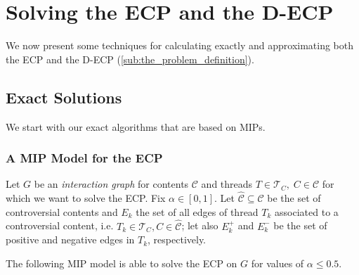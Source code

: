\chapter{Solving the \acrshort{ECP} and the \acrshort{D-ECP}}
\label{ch:solving}

We now present some techniques for calculating exactly and approximating both
the \acrshort{ECP} and the \acrshort{D-ECP} (\autoref{sub:the_problem_definition}).

\section{Exact Solutions}%
\label{sec:exact-solutions}

We start with our exact algorithms that are based on MIPs.

\subsection{A MIP Model for the \acrshort{ECP}}%
\label{sub:a_mip_model_for_the_ecp}

Let $G$ be an \emph{interaction graph} for contents $\mathcal{C} $ and
threads $T \in \mathcal{T}_{C}, \; C \in \mathcal{C} $ for which we want to
solve the \acrshort{ECP}. Fix
$\alpha \in [0, 1]$. Let $\mathcal{\hat{C}} \subseteq \mathcal{C} $ be the
set of controversial contents and $E_k$ the set
of all edges of thread $T_k$ associated to a controversial content, i.e. $T_{k}
	\in \mathcal{T}_{C}, C \in \mathcal{\hat{C}}$; let also $E^{+}_k $
and $E^{-}_k $ be the set of positive and negative edges in $T_k$, respectively.

The following \acrshort{MIP} model is able to solve the \acrshort{ECP} on $G$
for values of $\alpha \leq 0.5$.


